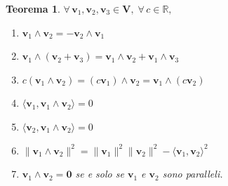\documentclass{article}
\theoremstyle{plain}
\newtheorem{thm}{Teorema}[section]
\theoremstyle{definition}
\theoremstyle{remark}
\begin{document}
\begin{bxthm}
\begin{thm}\label{diciottodue}
$\forall\,\mathbf{v}_1, \mathbf{v}_2, \mathbf{v}_3 \in \mathbf{V},\;\forall\,c \in \mathbb{R},$
\begin{enumerate}
    \item $\mathbf{v}_1 \wedge \mathbf{v}_2 = -\mathbf{v}_2 \wedge \mathbf{v}_1$
    \item $\mathbf{v}_1 \wedge (\mathbf{v}_2 + \mathbf{v}_3) = \mathbf{v}_1 \wedge \mathbf{v}_2 + \mathbf{v}_1 \wedge \mathbf{v}_3$
    \item $c (\mathbf{v}_1 \wedge \mathbf{v}_2) = (c \mathbf{v}_1) \wedge \mathbf{v}_2 = \mathbf{v}_1 \wedge (c \mathbf{v}_2)$
    \item $\langle \mathbf{v}_1, \mathbf{v}_1 \wedge \mathbf{v}_2 \rangle = 0$
    \item $\langle \mathbf{v}_2, \mathbf{v}_1 \wedge \mathbf{v}_2 \rangle = 0$
    \item $\|\mathbf{v}_1 \wedge \mathbf{v}_2\|^2 = \|\mathbf{v}_1\|^2 \|\mathbf{v}_2\|^2 - \langle \mathbf{v}_1, \mathbf{v}_2 \rangle^2$
    \item $\mathbf{v}_1 \wedge \mathbf{v}_2 = \mathbf{0}$ se e solo se $\mathbf{v}_1$ e $\mathbf{v}_2$ sono paralleli.
\end{enumerate}    
\end{thm}
\end{bxthm}
\end{document}
